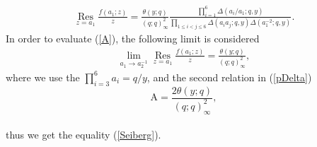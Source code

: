 \documentclass[a4paper,11pt]{article}%
\numberwithin{equation}{section}
\begin{document}
\begin{align}
  \underset{z=a_1}{\operatorname{Res}}\frac{f(a_1;z)}{z}= \frac{\theta(y;q)}{(q;q)^2_{\infty}} \frac{\prod_{i=1}^6\Delta(a_i/a_1;q,y)}{\prod_{1\leq i<j\leq 6}\Delta(a_ia_j;q,y)\Delta(a_1^{-2};q,y)}.
\end{align}
In order to evaluate (\ref{A}), the following limit is considered
\begin{align}
  \lim_{a_1 \to a_2^{-1}} \underset{z=a_1}{\operatorname{Res}}\frac{f(a_1;z)}{z}= \frac{\theta(y;q)}{(q;q)^2_{\infty}},
\end{align}
where we use the   $\prod_{i=3}^6 a_i=q/y$, and the second relation in (\ref{pDelta})
\begin{equation}
 \text{A} = \frac{2\theta(y;q)}{(q;q)^2_{\infty}},
\end{equation}\\
thus we get the equality (\ref{Seiberg}).





\end{document}
